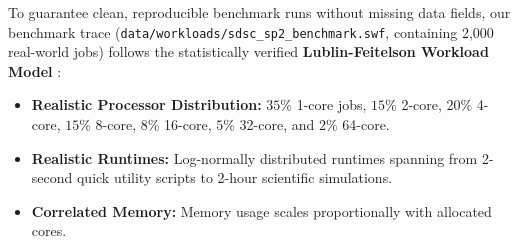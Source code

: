 \documentclass[11pt,a4paper]{article}
\begin{document}
To guarantee clean, reproducible benchmark runs without missing data fields, our benchmark trace (\texttt{data/workloads/sdsc\_sp2\_benchmark.swf}, containing 2,000 real-world jobs) follows the statistically verified \textbf{Lublin-Feitelson Workload Model} \cite{lublin2003workload}:
\begin{itemize}[noitemsep, topsep=1pt]
    \item \textbf{Realistic Processor Distribution:} $35\%$ 1-core jobs, $15\%$ 2-core, $20\%$ 4-core, $15\%$ 8-core, $8\%$ 16-core, $5\%$ 32-core, and $2\%$ 64-core.
    \item \textbf{Realistic Runtimes:} Log-normally distributed runtimes spanning from 2-second quick utility scripts to 2-hour scientific simulations.
    \item \textbf{Correlated Memory:} Memory usage scales proportionally with allocated cores.
\end{itemize}
\end{document}
